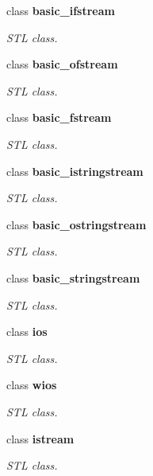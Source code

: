 \begin{CompactItemize}
class \textbf{basic\_\-ifstream}
\begin{CompactList}\small\item\em STL class. \item\end{CompactList}\item 
class \textbf{basic\_\-ofstream}
\begin{CompactList}\small\item\em STL class. \item\end{CompactList}\item 
class \textbf{basic\_\-fstream}
\begin{CompactList}\small\item\em STL class. \item\end{CompactList}\item 
class \textbf{basic\_\-istringstream}
\begin{CompactList}\small\item\em STL class. \item\end{CompactList}\item 
class \textbf{basic\_\-ostringstream}
\begin{CompactList}\small\item\em STL class. \item\end{CompactList}\item 
class \textbf{basic\_\-stringstream}
\begin{CompactList}\small\item\em STL class. \item\end{CompactList}\item 
class \textbf{ios}
\begin{CompactList}\small\item\em STL class. \item\end{CompactList}\item 
class \textbf{wios}
\begin{CompactList}\small\item\em STL class. \item\end{CompactList}\item 
class \textbf{istream}
\begin{CompactList}\small\item\em STL class. \item\end{CompactList}\item 

\end{CompactItemize}
